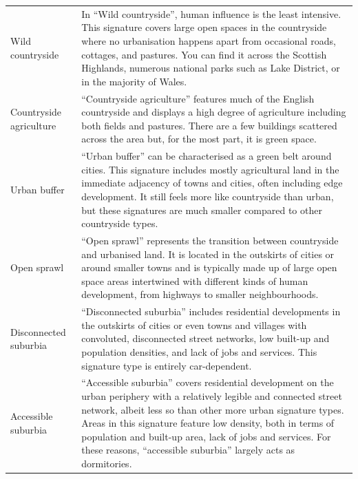 \begin{longtable}{p{}p{}}
    Wild countryside                     &                                                                                       In “Wild countryside”, human influence is the least intensive. This signature covers large open spaces in the countryside where no urbanisation happens apart from occasional roads, cottages, and pastures. You can find it across the Scottish Highlands, numerous national parks such as Lake District, or in the majority of Wales. \\
    Countryside agriculture              &                                                                                                                                                                               “Countryside agriculture” features much of the English countryside and displays a high degree of agriculture including both fields and pastures. There are a few buildings scattered across the area but, for the most part, it is green space. \\
    Urban buffer                         &                                                                                             “Urban buffer” can be characterised as a green belt around cities. This signature includes mostly agricultural land in the immediate adjacency of towns and cities, often including edge development. It still feels more like countryside than urban, but these signatures are much smaller compared to other countryside types. \\
    Open sprawl                          &                                                                                                                           “Open sprawl” represents the transition between countryside and urbanised land. It is located in the outskirts of cities or around smaller towns and is typically made up of large open space areas intertwined with different kinds of human development, from highways to smaller neighbourhoods. \\
    Disconnected suburbia                &                                                                                                                                           “Disconnected suburbia” includes residential developments in the outskirts of cities or even towns and villages with convoluted, disconnected street networks, low built-up and population densities, and lack of jobs and services. This signature type is entirely car-dependent. \\
    Accessible suburbia                  &                                        “Accessible suburbia” covers residential development on the urban periphery with a relatively legible and connected street network, albeit less so than other more urban signature types. Areas in this signature feature low density, both in terms of population and built-up area, lack of jobs and services. For these reasons, “accessible suburbia” largely acts as dormitories. \\

\end{longtable}
